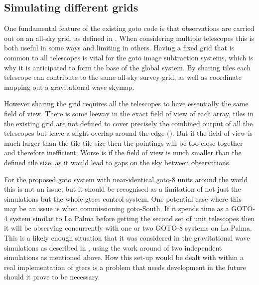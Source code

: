 \begin{colsection}
\begin{colsection}
\end{colsection}


\subsection{Simulating different grids}
\label{sec:multi_grid_scheduling}
\begin{colsection}

One fundamental feature of the existing \gls{goto} code is that observations are carried out on an all-sky grid, as defined in . When considering multiple telescopes this is both useful in some ways and limiting in others. Having a fixed grid that is common to all telescopes is vital for the \gls{goto} image subtraction systems, which is why it is anticipated to form the base of the global system. By sharing tiles each telescope can contribute to the same all-sky survey grid, as well as coordinate mapping out a gravitational wave skymap.

However sharing the grid requires all the telescopes to have essentially the same field of view. There is some leeway in the exact field of view of each array, tiles in the existing grid are not defined to cover precisely the combined output of all the telescopes but leave a slight overlap around the edge (). But if the field of view is much larger than the tile tile size then the pointings will be too close together and therefore inefficient. Worse is if the field of view is much smaller than the defined tile size, as it would lead to gaps on the sky between observations.

For the proposed \gls{goto} system with near-identical \gls{goto}-8 units around the world this is not an issue, but it should be recognised as a limitation of not just the simulations but the whole \gls{gtecs} control system. One potential case where this may be an issue is when commissioning \gls{goto}-South. If it spends time as a GOTO-4 system similar to La Palma before getting the second set of unit telescopes then it will be observing concurrently with one or two GOTO-8 systems on La Palma. This is a likely enough situation that it was considered in the gravitational wave simulations as described in , using the work around of two independent simulations as mentioned above. How this set-up would be dealt with within a real implementation of \gls{gtecs} is a problem that needs development in the future should it prove to be necessary.

\end{colsection}


\end{colsection}

